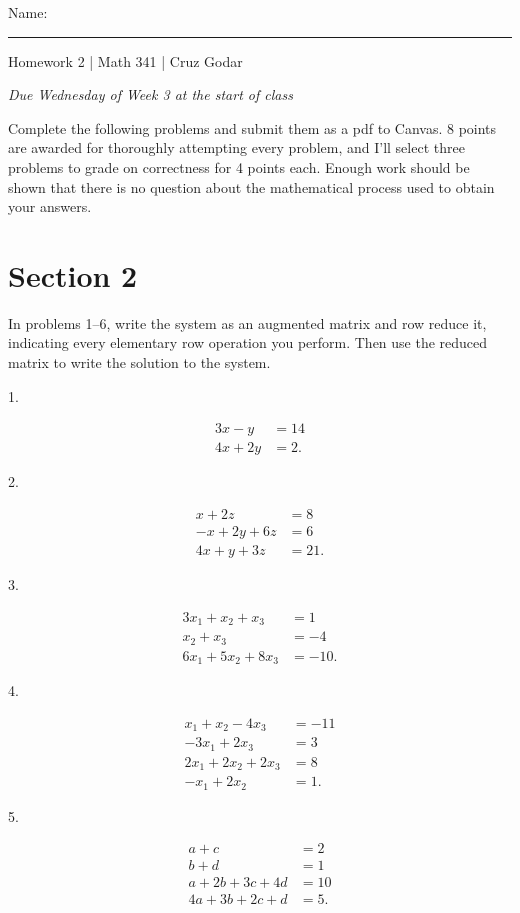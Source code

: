 \documentclass{article}
\begin{document}
\Large Name: \rule{2in}{0.15mm} \hfill Homework 2 | Math 341 | Cruz Godar \vspace{4pt}  \normalsize

\textit{Due Wednesday of Week 3 at the start of class}

Complete the following problems and submit them as a pdf to Canvas. 8 points are awarded for thoroughly attempting every problem, and I'll select three problems to grade on correctness for 4 points each. Enough work should be shown that there is no question about the mathematical process used to obtain your answers.

\section{Section 2}

In problems 1--6, write the system as an augmented matrix and row reduce it, indicating every elementary row operation you perform. Then use the reduced matrix to write the solution to the system.

1.

\begin{align*}
	3x - y &= 14\\
	4x + 2y &= 2.
\end{align*}

2.

\begin{align*}
	x + 2z &= 8\\
	-x + 2y + 6z &= 6\\
	4x + y + 3z &= 21.
\end{align*}

3.

\begin{align*}
	3x_1 + x_2 + x_3 &= 1\\
	x_2 + x_3 &= -4\\
	6x_1 + 5x_2 + 8x_3 &= -10.
\end{align*}

4.

\begin{align*}
	x_1 + x_2 - 4x_3 &= -11\\
	-3x_1 + 2x_3 &= 3\\
	2x_1 + 2x_2 + 2x_3 &= 8\\
	-x_1 + 2x_2 &= 1.
\end{align*}

5.

\begin{align*}
	a + c &= 2\\
	b + d &= 1\\
	a + 2b + 3c + 4d &= 10\\
	4a + 3b + 2c + d &= 5.
\end{align*}
\end{document}

